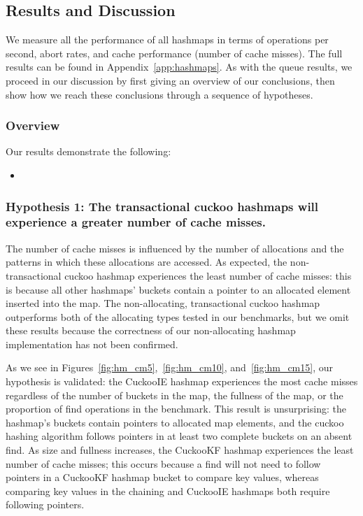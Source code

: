 \subsection{Results and Discussion}

We measure all the performance of all hashmaps in terms of operations per second, abort rates, and cache performance (number of cache misses). 
The full results can be found in Appendix~\ref{app:hashmaps}. As with the queue results, we proceed in our discussion by first giving an overview of our conclusions, then show how we reach these conclusions through a sequence of hypotheses.

\subsubsection{Overview}
Our results demonstrate the following:
\begin{itemize}
    \item 
\end{itemize}





\subsubsection{Hypothesis 1: The transactional cuckoo hashmaps will experience a greater number of cache misses.}

The number of cache misses is influenced by the number of allocations and the patterns in which these allocations are accessed. As expected, the non-transactional cuckoo hashmap experiences the least number of cache misses: this is because all other hashmaps' buckets contain a pointer to an allocated element inserted into the map. The non-allocating, transactional cuckoo hashmap outperforms both of the allocating types tested in our benchmarks, but we omit these results because the correctness of our non-allocating hashmap implementation has not been confirmed.

As we see in Figures~\ref{fig:hm_cm5},~\ref{fig:hm_cm10}, and~\ref{fig:hm_cm15}, our hypothesis is validated: the CuckooIE hashmap experiences the most cache misses regardless of the number of buckets in the map, the fullness of the map, or the proportion of find operations in the benchmark. This result is unsurprising: the hashmap's buckets contain pointers to allocated map elements, and the cuckoo hashing algorithm follows pointers in at least two complete buckets on an absent find. As size and fullness increases, the CuckooKF hashmap experiences the least number of cache misses; this occurs because a find will not need to follow pointers in a CuckooKF hashmap bucket to compare key values, whereas comparing key values in the chaining and CuckooIE hashmaps both require following pointers.


